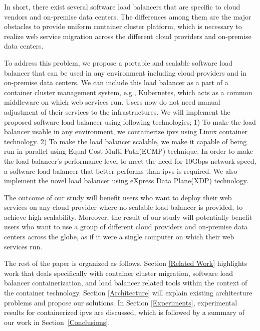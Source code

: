 In short, there exist several software load balancers that are specific to cloud vendors and on-premise data centers.
The differences among them are the major obstacles to provide uniform container cluster platform, which is necessary to realize web service migration across the different cloud providers and on-premise data centers.

To address this problem, we propose a portable and scalable software load balancer that can be used in any environment including cloud providers and in on-premise data centers.
We can include this load balancer as a part of a container cluster management system, e.g., Kubernetes\cite{K8s2017}, which acts as a common middleware on which web services run.
Users now do not need manual adjustment of their services to the infrastructures.
We will implement the proposed software load balancer using following technologies;
1) To make the load balancer usable in any environment, we containerize ipvs\cite{Zhang2000} using Linux container technology\cite{menage2007adding}.
2) To make the load balancer scalable, we make it capable of being run in parallel using Equal Cost Multi-Path(ECMP) technique\cite{al2008scalable}.
In order to make the load balancer's performance level to meet the need for 10Gbps network speed, a software load balancer that better performs than ipvs is required.
We also implement the novel load balancer using eXpress Data Plane(XDP) technology\cite{bertin2017xdp}.

The outcome of our study will benefit users who want to deploy their web services on any cloud provider where no scalable load balancer is provided, to achieve high scalability.
Moreover, the result of our study will potentially benefit users who want to use a group of different cloud providers and on-premise data centers across the globe, as if it were a single computer on which their web services run.

The rest of the paper is organized as follows.
Section \ref{Related Work} highlights work that deals specifically with container cluster migration, 
software load balancer containerization, and load balancer related tools within the context of the container technology. 
Section \ref{Architecture} will explain existing architecture problems and propose our solutions.
In Section \ref{Experiments}, experimental results for containerized ipvs are discussed,  
which is followed by a summary of our work in Section~\ref{Conclusions}.




